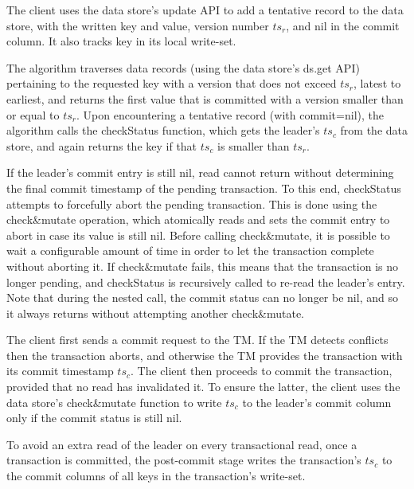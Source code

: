 The client uses the data store's update API to add a tentative record to the data store, with the written key and value, 
version number $ts_r$, and nil in the commit column.
It also tracks key in its local write-set.

The algorithm traverses data  records (using the data store's ds.get API) pertaining
to the requested key with a version that does not exceed $ts_r$, latest to earliest, and returns the first value that is committed
with a  version smaller than or equal to $ts_r$. Upon
encountering a tentative record (with commit=nil), the algorithm calls the {\sc checkStatus} function, which
gets the leader's $ts_c$ from the data store, and again returns the key if that $ts_c$ is smaller than $ts_r$. 

If the leader's commit entry is still nil, read cannot return without determining the final commit timestamp
of the pending transaction. 
To this end, {\sc checkStatus} attempts to forcefully abort the pending transaction. This is done using the
 {check\&mutate} operation, which atomically reads and sets the commit entry to abort in case its value is still nil. 
Before calling {check\&mutate}, it is possible to wait a configurable amount of time in order to let the transaction complete without aborting it.
If check\&mutate fails, this means that the transaction is no longer pending, and {\sc checkStatus} is recursively called to
re-read the leader's entry. Note that during the nested call, the commit status can no longer be nil, and so it
always returns without attempting another check\&mutate.
 


The client first 
sends a commit request to the TM. 
If the TM detects conflicts then the transaction aborts, and otherwise the TM provides the transaction with its commit  timestamp $ts_c$. 
The client then proceeds to commit the transaction, provided that no read has invalidated it. To ensure the latter, the client uses 
the data store's check\&mutate function to write $ts_c$ to the leader's commit column 
only if the commit status is still nil.

To avoid an extra read of the leader on every transactional read, once a transaction is committed, the post-commit stage writes 
the transaction's $ts_c$ to the commit columns of all keys in  the transaction's write-set. 

